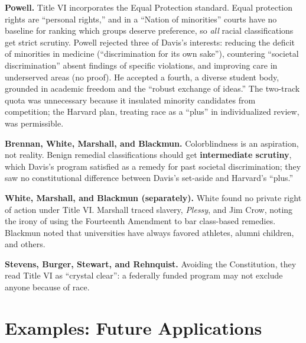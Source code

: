 \documentclass[12pt]{article}
\begin{document}
\textbf{Powell.} Title VI incorporates the Equal Protection standard. Equal protection rights are ``personal rights,'' and in a ``Nation of minorities'' courts have no baseline for ranking which groups deserve preference, so \textit{all} racial classifications get strict scrutiny. Powell rejected three of Davis's interests: reducing the deficit of minorities in medicine (``discrimination for its own sake''), countering ``societal discrimination'' absent findings of specific violations, and improving care in underserved areas (no proof). He accepted a fourth, a diverse student body, grounded in academic freedom and the ``robust exchange of ideas.'' The two-track quota was unnecessary because it insulated minority candidates from competition; the Harvard plan, treating race as a ``plus'' in individualized review, was permissible.

\textbf{Brennan, White, Marshall, and Blackmun.} Colorblindness is an aspiration, not reality. Benign remedial classifications should get \textbf{intermediate scrutiny}, which Davis's program satisfied as a remedy for past societal discrimination; they saw no constitutional difference between Davis's set-aside and Harvard's ``plus.''

\textbf{White, Marshall, and Blackmun (separately).} White found no private right of action under Title VI. Marshall traced slavery, \textit{Plessy}, and Jim Crow, noting the irony of using the Fourteenth Amendment to bar class-based remedies. Blackmun noted that universities have always favored athletes, alumni children, and others.

\textbf{Stevens, Burger, Stewart, and Rehnquist.} Avoiding the Constitution, they read Title VI as ``crystal clear'': a federally funded program may not exclude anyone because of race.

\section{Examples: Future Applications}
\end{document}
